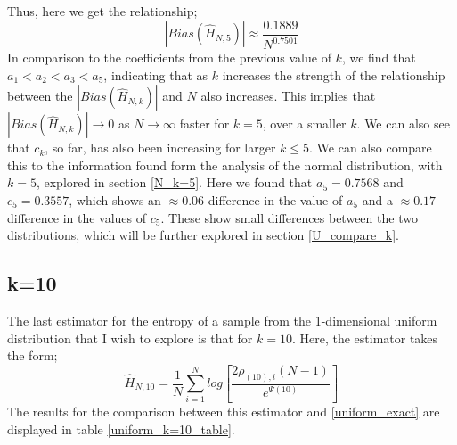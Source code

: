 \documentclass{report}
\begin{document}
Thus, here we get the relationship;
\begin{equation}
|Bias(\hat{H}_{N, 5})| \approx \frac{0.1889}{N^{0.7501}}\nonumber
\end{equation}
In comparison to the coefficients from the previous value of $k$, we find that $a_{1} < a_{2} < a_{3} < a_{5}$, indicating that as $k$ increases the strength of the relationship between the $|Bias(\hat{H}_{N, k})|$ and $N$ also increases. This implies that $|Bias(\hat{H}_{N, k})| \to 0$ as $N \to \infty$ faster for $k=5$, over a smaller $k$. We can also see that $c_{k}$, so far, has also been increasing for larger $k \leq 5$.
We can also compare this to the information found form the analysis of the normal distribution, with $k=5$, explored in section \ref{N_k=5}. Here we found that $a_{5}=0.7568$ and $c_{5}=0.3557$, which shows an $\approx 0.06$ difference in the value of $a_{5}$ and a $\approx 0.17$ difference in the values of $c_{5}$. These show small differences between the two distributions, which will be further explored in section \ref{U_compare_k}.






\subsection{k=10} \label{U_k=10}
The last estimator for the entropy of a sample from the 1-dimensional uniform distribution that I wish to explore is that for $k=10$. Here, the estimator takes the form;
\begin{equation}
\hat{H}_{N, 10} = \frac{1}{N} \sum_{i=1}^{N} log \left[ \frac{2\rho_{(10),i}(N-1)}{e^{\Psi(10)}} \right] \nonumber
\end{equation}
The results for the comparison between this estimator and \ref{uniform_exact} are displayed in table \ref{uniform_k=10_table}.
\end{document}
